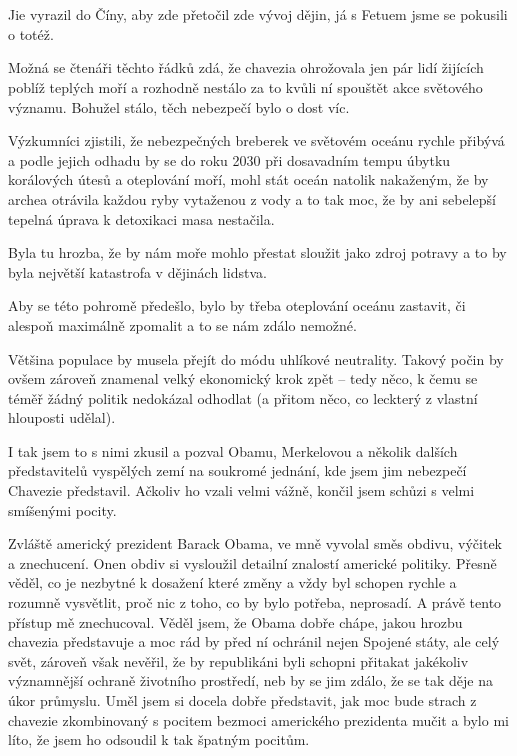 \chapter{}
Jie vyrazil do Číny, aby zde přetočil zde vývoj dějin, já s Fetuem jsme se pokusili o totéž.

Možná se čtenáři těchto řádků zdá, že chavezia ohrožovala jen pár lidí žijících poblíž teplých moří a rozhodně nestálo za to kvůli ní spouštět akce světového významu. Bohužel stálo, těch nebezpečí bylo o dost víc.

Výzkumníci zjistili, že nebezpečných breberek ve světovém oceánu rychle přibývá a podle jejich odhadu by se do roku 2030 při dosavadním tempu úbytku korálových útesů a oteplování moří, mohl stát oceán natolik nakaženým, že by archea  otrávila každou ryby vytaženou z vody a to tak moc, že by ani sebelepší tepelná úprava k detoxikaci masa nestačila.

Byla tu hrozba, že by nám moře mohlo přestat sloužit jako zdroj potravy a to by byla největší katastrofa v dějinách lidstva.

Aby se této pohromě předešlo, bylo by třeba oteplování oceánu zastavit, či alespoň maximálně zpomalit a to se nám zdálo nemožné.

Většina populace by musela přejít do módu uhlíkové neutrality. Takový počin by ovšem zároveň znamenal velký ekonomický krok zpět – tedy něco, k čemu se téměř žádný politik nedokázal odhodlat (a přitom něco, co leckterý z vlastní hlouposti udělal).

I tak jsem to s nimi zkusil a pozval Obamu, Merkelovou a několik dalších představitelů vyspělých zemí na soukromé jednání, kde jsem jim nebezpečí Chavezie představil. Ačkoliv ho vzali velmi vážně, končil jsem schůzi s velmi smíšenými pocity.

Zvláště americký prezident Barack Obama, ve mně vyvolal směs obdivu, výčitek a znechucení. Onen obdiv si vysloužil detailní znalostí americké politiky. Přesně věděl, co je nezbytné k dosažení které změny a vždy byl schopen rychle a rozumně vysvětlit, proč nic z toho, co by bylo potřeba, neprosadí. A právě tento přístup mě znechucoval. Věděl jsem, že Obama dobře chápe, jakou hrozbu chavezia představuje a moc rád by před ní ochránil nejen Spojené státy, ale celý svět, zároveň však nevěřil, že by republikáni byli schopni přitakat jakékoliv významnější ochraně životního prostředí, neb by se jim zdálo, že se tak děje na úkor průmyslu. Uměl jsem si docela dobře představit, jak moc bude strach z chavezie zkombinovaný s pocitem bezmoci amerického prezidenta mučit a bylo mi líto, že jsem ho odsoudil k tak špatným pocitům.

